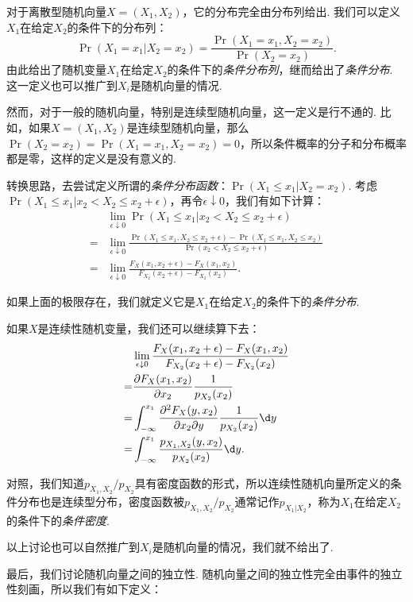 对于离散型随机向量$X=(X_1,X_2)$，它的分布完全由分布列给出. 我们可以定义$X_1$在给定$X_2$的条件下的分布列：
\[\Pr(X_1=x_1|X_2=x_2)=\frac{\Pr(X_1=x_1,X_2=x_2)}{\Pr(X_2=x_2)}.\]
由此给出了随机变量$X_1$在给定$X_2$的条件下的\emph{条件分布列}，继而给出了\emph{条件分布}. 这一定义也可以推广到$X_i$是随机向量的情况. 

然而，对于一般的随机向量，特别是连续型随机向量，这一定义是行不通的. 比如，如果$X=(X_1,X_2)$是连续型随机向量，那么 $\Pr(X_2=x_2)=\Pr(X_1=x_1,X_2=x_2)=0$，所以条件概率的分子和分布概率都是零，这样的定义是没有意义的. 

转换思路，去尝试定义所谓的\emph{条件分布函数}：$\Pr(X_1\leq x_1|X_2=x_2)$. 考虑$\Pr(X_1\leq x_1|x_2< X_2\leq x_2+\epsilon)$，再令$\epsilon\downarrow 0$，我们有如下计算：
\begin{align*}
    &\lim_{\epsilon\downarrow 0}\Pr(X_1\leq x_1|x_2< X_2\leq x_2+\epsilon) \\
    =&\lim_{\epsilon\downarrow 0}\frac{\Pr(X_1\leq x_1,X_2\leq x_2+\epsilon)-\Pr(X_1\leq x_1,X_2\leq x_2)}{\Pr(x_2< X_2\leq x_2+\epsilon)}\\
    =&\lim_{\epsilon\downarrow 0}\frac{F_X(x_1,x_2+\epsilon)-F_X(x_1,x_2)}{F_{X_2}(x_2+\epsilon)-F_{X_2}(x_2)}.
\end{align*}

如果上面的极限存在，我们就定义它是$X_1$在给定$X_2$的条件下的\emph{条件分布}. 

如果$X$是连续性随机变量，我们还可以继续算下去：
\begin{align*}
    &\lim_{\epsilon\downarrow 0}\frac{F_X(x_1,x_2+\epsilon)-F_X(x_1,x_2)}{F_{X_2}(x_2+\epsilon)-F_{X_2}(x_2)}\\
    =&\frac{\partial F_X(x_1,x_2)}{\partial x_2}\frac{1}{p_{X_2}(x_2)}\\
    =&\int_{-\infty}^{x_1}\frac{\partial^2 F_X(y,x_2)}{\partial x_2\partial y}\frac{1}{p_{X_2}(x_2)}\d y\\
    =&\int_{-\infty}^{x_1}\frac{p_{X_1,X_2}(y,x_2)}{p_{X_2}(x_2)}\d y.
\end{align*}

对照，我们知道$p_{X_1,X_2}/p_{X_2}$具有密度函数的形式，所以连续性随机向量所定义的条件分布也是连续型分布，密度函数被$p_{X_1,X_2}/p_{X_2}$通常记作$p_{X_1|X_2}$，称为$X_1$在给定$X_2$的条件下的\emph{条件密度}. 

以上讨论也可以自然推广到$X_i$是随机向量的情况，我们就不给出了. 

最后，我们讨论随机向量之间的独立性. 随机向量之间的独立性完全由事件的独立性刻画，所以我们有如下定义：

